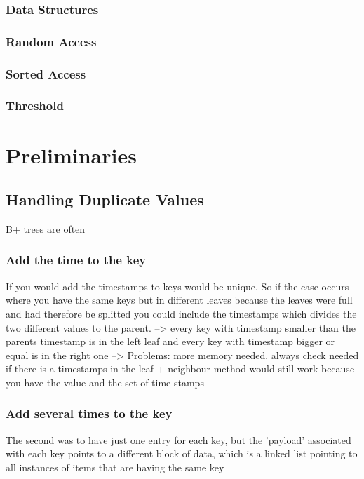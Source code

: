 \documentclass[abstracton,12pt]{scrreprt}
\begin{document}
\subsection{Data Structures}


\subsection{Random Access}

\subsection{Sorted Access}

\subsection{Threshold}


\chapter{Preliminaries}
\label{sec:P}


\section{Handling Duplicate Values}

B+ trees are often 

\subsection{Add the time to the key}
If you would add the timestamps to keys would be unique. So if the case occurs where you have the same keys but in different leaves because the leaves were full and had therefore be splitted you could include the timestamps which divides the two different values to the parent. --> every key with timestamp smaller than the parents timestamp is in the left leaf and every key with timestamp bigger or equal is in the right one --> 
Problems: more memory needed. always check needed if there is a timestamps in the leaf
+ neighbour method would still work because you have the value and the set of time stamps 

\subsection{Add several times to the key}

The second was to have just one entry for each key, but the 'payload' associated with each key points to a different block of data, which is a linked list pointing to all instances of items that are having the same key
\end{document}
